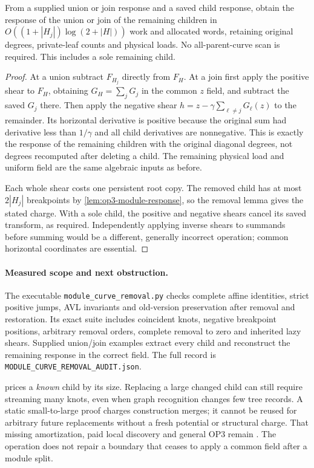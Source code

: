 \begin{corollary}
\label{cor:op3-module-child-extraction}
From a supplied union or join response and a saved child response, obtain
the response of the union or join of the remaining children in
$O((1+|H_j|)\log(2+|H|))$ work and allocated words, retaining original
degrees, private-leaf counts and physical loads. No all-parent-curve scan
is required. This includes a sole remaining child.
\end{corollary}
\begin{proof}
At a union subtract $F_{H_j}$ directly from $F_H$. At a join first apply
the positive shear to $F_H$, obtaining $G_H=\sum_jG_j$ in the common $z$
field, and subtract the saved $G_j$ there. Then apply the negative shear
$h=z-\gamma\sum_{\ell\ne j}G_\ell(z)$ to the remainder. Its horizontal
derivative is positive because the original sum had derivative less than
$1/\gamma$ and all child derivatives are nonnegative. This is exactly
the response of the remaining children with the original diagonal degrees,
not degrees recomputed after deleting a child. The remaining physical
load and uniform field are the same algebraic inputs as before.

Each whole shear costs one persistent root copy. The removed child has
at most $2|H_j|$ breakpoints by \cref{lem:op3-module-response}, so the
removal lemma gives the stated charge. With a sole child, the positive
and negative shears cancel its saved transform, as required. Independently
applying inverse shears to summands before summing would be a different,
generally incorrect operation; common horizontal coordinates are essential.
\end{proof}

\paragraph{Measured scope and next obstruction.}
The executable \texttt{module\_curve\_removal.py} checks complete affine
identities, strict positive jumps, AVL invariants and old-version preservation
after removal and restoration. Its exact suite includes coincident knots,
negative breakpoint positions, arbitrary removal orders, complete removal
to zero and inherited lazy shears. Supplied union/join examples extract
every child and reconstruct the remaining response in the correct field.
The full record is \texttt{MODULE\_CURVE\_REMOVAL\_AUDIT.json}.

 prices a \emph{known} child by its
size. Replacing a large changed child can still require streaming many
knots, even when graph recognition changes few tree records. A static
small-to-large proof charges construction merges; it cannot be reused for
arbitrary future replacements without a fresh potential or structural
charge. That missing amortization, paid local discovery and general OP3
remain \statusopen. The operation does not repair a boundary that ceases
to apply a common field after a module split.
